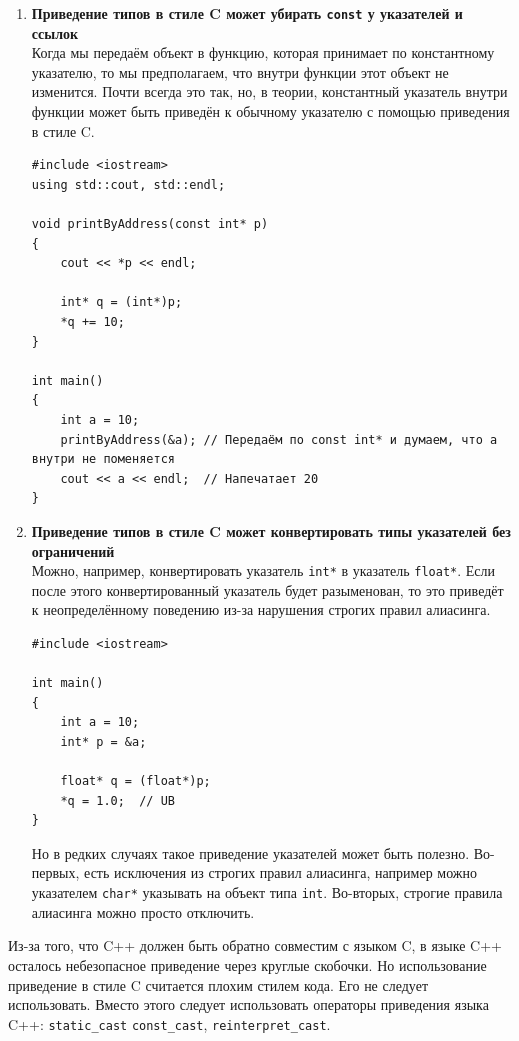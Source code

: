 \documentclass{article}
\begin{document}
\begin{enumerate}
\item \textbf{Приведение типов в стиле C может убирать \texttt{const} у указателей и ссылок}\\
Когда мы передаём объект в функцию, которая принимает по константному указателю, то мы предполагаем, что внутри функции этот объект не изменится. Почти всегда это так, но, в теории, константный указатель внутри функции может быть приведён к обычному указателю с помощью приведения в стиле C.
\begin{lstlisting}
#include <iostream>
using std::cout, std::endl;

void printByAddress(const int* p)
{
    cout << *p << endl;
    
    int* q = (int*)p;
    *q += 10;
}

int main()
{
    int a = 10;
    printByAddress(&a); // Передаём по const int* и думаем, что a внутри не поменяется
    cout << a << endl;  // Напечатает 20
}
\end{lstlisting}

\item \textbf{Приведение типов в стиле C может конвертировать типы указателей без ограничений}\\
Можно, например, конвертировать указатель \texttt{int*} в указатель \texttt{float*}. Если после этого конвертированный указатель будет разыменован, то это приведёт к неопределённому поведению из-за нарушения строгих правил алиасинга.
\begin{lstlisting}
#include <iostream>

int main()
{
    int a = 10;
    int* p = &a;
    
    float* q = (float*)p;
    *q = 1.0;  // UB
}
\end{lstlisting}
Но в редких случаях такое приведение указателей может быть полезно. Во-первых, есть исключения из строгих правил алиасинга, например можно указателем \texttt{char*} указывать на объект типа \texttt{int}. Во-вторых, строгие правила алиасинга можно просто отключить.
\end{enumerate}

Из-за того, что C++ должен быть обратно совместим с языком C, в языке C++ осталось небезопасное приведение через круглые скобочки. Но использование приведение в стиле C считается плохим стилем кода. Его не следует использовать. Вместо этого следует использовать операторы приведения языка C++: \texttt{static\_cast} \texttt{const\_cast}, \texttt{reinterpret\_cast}.
\end{document}
